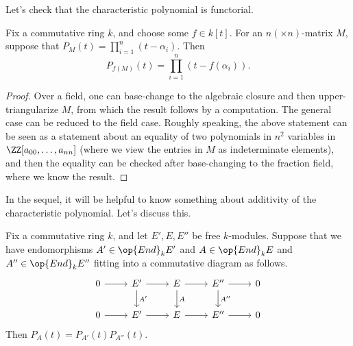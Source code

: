 \documentclass[../notes.tex]{subfiles}
\begin{document}
Let's check that the characteristic polynomial is functorial.
\begin{proposition}
	Fix a commutative ring $k$, and choose some $f\in k[t]$. For an $n(\times n)$-matrix $M$, suppose that $P_M(t)=\prod_{i=1}^n(t-\alpha_i)$. Then
	\[P_{f(M)}(t)=\prod_{i=1}^n(t-f(\alpha_i)).\]
\end{proposition}
\begin{proof}
	Over a field, one can base-change to the algebraic closure and then upper-triangularize $M$, from which the result follows by a computation. The general case can be reduced to the field case. Roughly speaking, the above statement can be seen as a statement about an equality of two polynomials in $n^2$ variables in $\ZZ[a_{00},\ldots,a_{nn}]$ (where we view the entries in $M$ as indeterminate elements), and then the equality can be checked after base-changing to the fraction field, where we know the result.
\end{proof}
In the sequel, it will be helpful to know something about additivity of the characteristic polynomial. Let's discuss this.
\begin{theorem} \label{thm:char-poly-ses}
	Fix a commutative ring $k$, and let $E',E,E''$ be free $k$-modules. Suppose that we have endomorphisms $A'\in\op{End}_kE'$ and $A\in\op{End}_kE$ and $A''\in\op{End}_kE''$ fitting into a commutative diagram as follows.
	\[\begin{tikzcd}
		0 & {E'} & E & {E''} & 0 \\
		0 & {E'} & E & {E''} & 0
		\arrow[from=1-1, to=1-2]
		\arrow[from=1-2, to=1-3]
		\arrow["{A'}", from=1-2, to=2-2]
		\arrow[from=1-3, to=1-4]
		\arrow["A", from=1-3, to=2-3]
		\arrow[from=1-4, to=1-5]
		\arrow["{A''}", from=1-4, to=2-4]
		\arrow[from=2-1, to=2-2]
		\arrow[from=2-2, to=2-3]
		\arrow[from=2-3, to=2-4]
		\arrow[from=2-4, to=2-5]
	\end{tikzcd}\]
	Then $P_A(t)=P_{A'}(t)P_{A''}(t)$.
\end{theorem}
\end{document}
